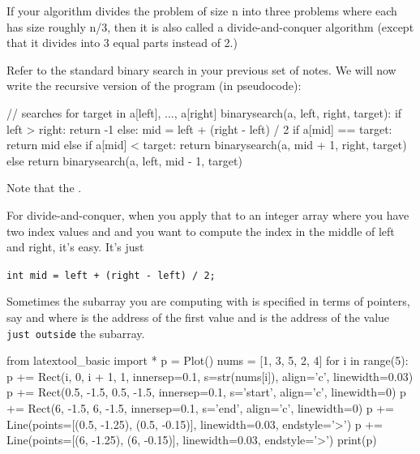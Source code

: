 If your algorithm divides the problem of size n into three problems
where each has size roughly n/3, then it is also called a
divide-and-conquer algorithm (except that it divides into 3 equal parts
instead of 2.)






Refer to the standard binary search in your previous set of notes. We
will now write the recursive version of the program (in pseudocode):

\begin{console}
// searches for target in a[left], ..., a[right]
binarysearch(a, left, right, target):
    if left > right:
        return -1
    else:
        mid = left + (right - left) / 2
        if a[mid] == target:
            return mid
        else if a[mid] < target:
            return binarysearch(a, mid + 1, right, target)
        else
            return binarysearch(a, left, mid - 1, target)
\end{console}

Note that the .


For divide-and-conquer, when you apply that to an integer array where
you have two index values  and 
and you want to compute the index in the middle of left and right, it's
easy. It's just

\verb!int mid = left + (right - left) / 2;!

Sometimes the subarray you are computing with is specified in terms of
pointers, say  and  where
 is the address of the first value and
 is the address of the value \texttt{just outside} the
subarray.

\begin{python}
from latextool_basic import *
p = Plot()
nums = [1, 3, 5, 2, 4]
for i in range(5):
    p += Rect(i, 0, i + 1, 1, innersep=0.1, s=str(nums[i]), align='c', linewidth=0.03)
p += Rect(0.5, -1.5, 0.5, -1.5, innersep=0.1, s='start', align='c', linewidth=0)
p += Rect(6, -1.5, 6, -1.5, innersep=0.1, s='end', align='c', linewidth=0)
p += Line(points=[(0.5, -1.25), (0.5, -0.15)], linewidth=0.03, endstyle='>')
p += Line(points=[(6, -1.25), (6, -0.15)], linewidth=0.03, endstyle='>')
print(p)
\end{python}


